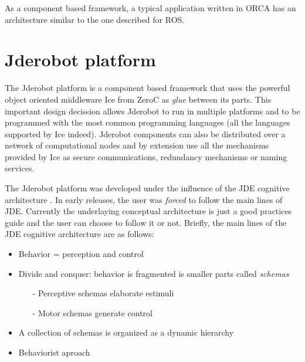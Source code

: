 \documentclass[twocolumn]{svjour3}          %
\begin{document}
As a component based framework, a typical application written in ORCA has an architecture similar to the one described for ROS.

\section{Jderobot platform}
\label{sec:jderobot}

The Jderobot platform is a component based framework that uses the powerful object oriented middleware Ice from ZeroC as \textit{glue} between its parts. This important design decission allows Jderobot to run in multiple platforms and to be programmed with the most common programming languages (all the languages supported by Ice indeed). Jderobot components can also be distributed over a network of computational nodes and by extension use all the mechanisms provided by Ice as secure communications, redundancy mechanisms or naming services. 


The Jderobot platform was developed under the influence of the JDE cognitive architecture \cite{canas02,canas05e}. In early releases, the user was \textit{forced} to follow the main lines of JDE. Currently the underlaying conceptual architecture is just a good practices guide and the user can choose to follow it or not. Briefly, the main lines of the JDE cognitive architecture are as follows:

\begin{itemize}
\item Behavior = {perception} and {control}
\item Divide and conquer: behavior is fragmented is smaller parts called \textit{schemas}
\begin{itemize}
\item[-] Perceptive schemas elaborate estimuli
\item[-] Motor schemas generate control
\end{itemize}
\item A collection of schemas is organized as a dynamic hierarchy
\item Behaviorist aproach
\end{itemize}
\end{document}
